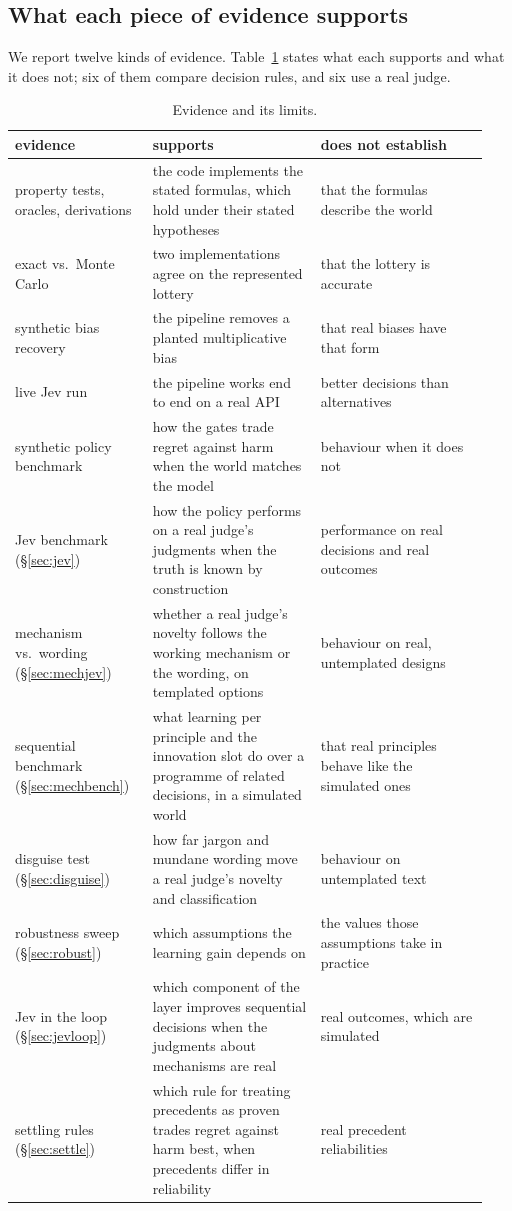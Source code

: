 \documentclass[11pt]{article}
\theoremstyle{definition}
\begin{document}
\subsection{What each piece of evidence supports}

We report twelve kinds of evidence. Table~\ref{tab:evidence} states what each supports and what it
does not; six of them compare decision rules, and six use a real judge.

\begin{table}[h]
\centering\small
\setlength{\tabcolsep}{4pt}
\begin{tabular}{@{}p{0.27\linewidth}p{0.335\linewidth}p{0.335\linewidth}@{}}
\toprule
evidence & supports & does not establish \\
\midrule
property tests, oracles, derivations & the code implements the stated formulas, which hold under
their stated hypotheses & that the formulas describe the world \\
exact vs.\ Monte Carlo & two implementations agree on the represented lottery & that the lottery
is accurate \\
synthetic bias recovery & the pipeline removes a planted multiplicative bias & that real biases have
that form \\
live Jev run & the pipeline works end to end on a real API & better decisions than alternatives \\
synthetic policy benchmark & how the gates trade regret against harm when the world matches the
model & behaviour when it does not \\
Jev benchmark (\S\ref{sec:jev}) & how the policy performs on a real judge's judgments when the truth is known by construction &
performance on real decisions and real outcomes \\
mechanism vs.\ wording (\S\ref{sec:mechjev}) & whether a real judge's novelty follows the
working mechanism or the wording, on templated options & behaviour on real, untemplated designs \\
sequential benchmark (\S\ref{sec:mechbench}) & what learning per principle and the innovation
slot do over a programme of related decisions, in a simulated world & that real principles behave
like the simulated ones \\
disguise test (\S\ref{sec:disguise}) & how far jargon and mundane wording move a real judge's
novelty and classification & behaviour on untemplated text \\
robustness sweep (\S\ref{sec:robust}) & which assumptions the learning gain depends on & the
values those assumptions take in practice \\
Jev in the loop (\S\ref{sec:jevloop}) & which component of the layer improves sequential decisions
when the judgments about mechanisms are real & real outcomes, which are simulated \\
settling rules (\S\ref{sec:settle}) & which rule for treating precedents as proven trades regret
against harm best, when precedents differ in reliability & real precedent reliabilities \\
\bottomrule
\end{tabular}
\caption{Evidence and its limits.}
\label{tab:evidence}
\end{table}
\end{document}
